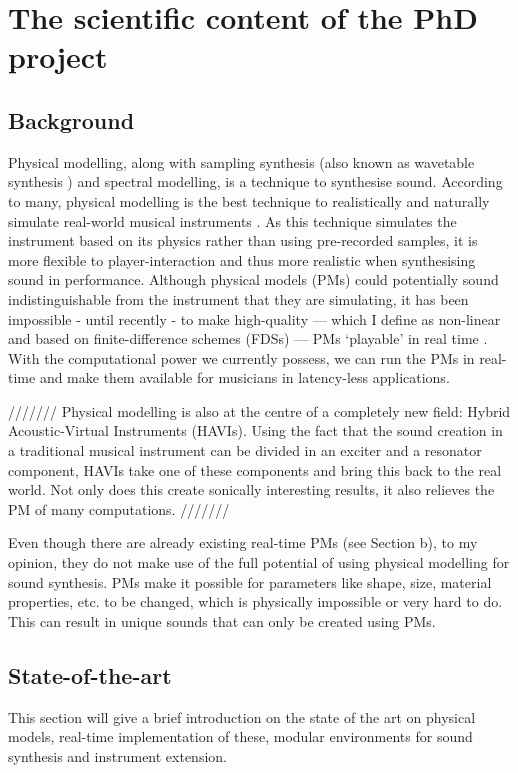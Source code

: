 \section{The scientific content of the PhD project}

\subsection{Background}
Physical modelling, along with sampling synthesis (also known as wavetable synthesis \cite{Smith2010a}) and spectral modelling, is a technique to synthesise sound. According to many, physical modelling is the best technique to realistically and naturally simulate real-world musical instruments \cite{Valimaki2006, Smith2010b, Bilbao2009}. As this technique simulates the instrument based on its physics rather than using pre-recorded samples, it is more flexible to player-interaction and thus more realistic when synthesising sound in performance. Although physical models (PMs) could potentially sound indistinguishable from the instrument that they are simulating, it has been impossible - until recently - to make high-quality — which I define as non-linear and based on finite-difference schemes (FDSs) — PMs ‘playable’ in real time \cite{Smith2010a}. With the computational power we currently possess, we can run the PMs in real-time and make them available for musicians in latency-less applications.

///////
Physical modelling is also at the centre of a completely new field: Hybrid Acoustic-Virtual Instruments (HAVIs). Using the fact that the sound creation in a traditional musical instrument can be divided in an exciter and a resonator component, HAVIs take one of these components and bring this back to the real world. Not only does this create sonically interesting results, it also relieves the PM of many computations.
///////

Even though there are already existing real-time PMs (see Section b), to my opinion, they do not make use of the full potential of using physical modelling for sound synthesis. PMs make it possible for parameters like shape, size, material properties, etc. to be changed, which is physically impossible or very hard to do. This can result in unique sounds that can only be created using PMs.

\subsection{State-of-the-art}
This section will give a brief introduction on the state of the art on physical models, real-time implementation of these, modular environments for sound synthesis and instrument extension.

